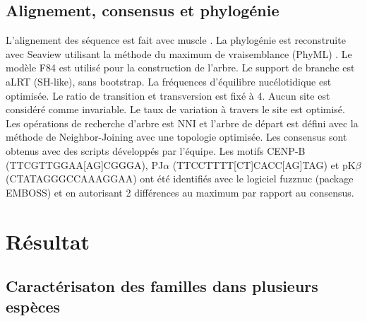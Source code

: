\documentclass[12pt,a4paper]{article}
\begin{document}
\subsection{Alignement, consensus et phylogénie}
L'alignement des séquence est fait avec muscle \cite{muscle}. La phylogénie est reconstruite avec Seaview 
\cite{seaview} utilisant la méthode du maximum de vraisemblance (PhyML) \cite{phyml}. Le modèle F84 est utilisé pour la construction de l'arbre. Le support de branche est aLRT (SH-like), sans bootstrap. La fréquences d'équilibre nucélotidique est optimisée. Le ratio de transition et transversion est fixé à 4. Aucun site est considéré comme invariable. Le taux de variation à travers le site est optimisé. Les opérations de recherche d'arbre est NNI et l'arbre de départ est défini avec la méthode de Neighbor-Joining \cite{NJ} avec une topologie optimisée.
Les consensus sont obtenus avec des scripts développés par l'équipe. Les motifs CENP-B (TTCGTTGGAA[AG]CGGGA), PJ$\alpha$ (TTCCTTTT[CT]CACC[AG]TAG) et pK$\beta$ (CTATAGGGCCAAAGGAA) ont été identifiés avec le logiciel fuzznuc (package EMBOSS) \cite{emboss} et en autorisant 2 différences au maximum par rapport au consensus. 

\section{Résultat}
	\subsection{Caractérisaton des familles dans plusieurs espèces}
\end{document}
